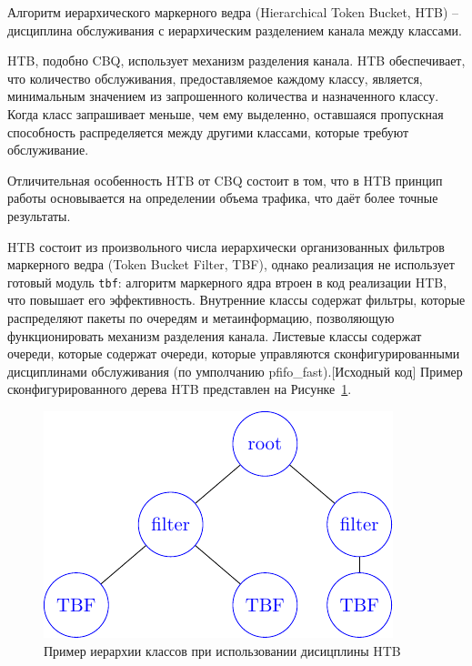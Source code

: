         Алгоритм иерархического маркерного ведра (Hierarchical Token Bucket, HTB) -- дисциплина
        обслуживания с иерархическим разделением канала между классами.

		HTB, подобно CBQ, использует механизм разделения канала. 
		HTB обеспечивает, что количество обслуживания, предоставляемое каждому классу, является,
		минимальным значением из запрошенного количества и назначенного классу. Когда класс
		запрашивает меньше, чем ему выделенно, оставшаяся пропускная способность распределяется между
		другими классами, которые требуют обслуживание.\cite{htb}

		Отличительная особенность HTB от CBQ состоит в том, что в HTB принцип работы
		основывается на определении объема трафика\cite{lartc}, что даёт более точные результаты.

		HTB состоит из произвольного числа иерархически организованных фильтров маркерного
        ведра (Token Bucket Filter, TBF)\cite{packethandling}, однако реализация не использует готовый
		модуль \texttt{tbf}: алгоритм маркерного ядра втроен в код реализации HTB,	
		что повышает его эффективность. Внутренние классы содержат фильтры, которые
		распределяют пакеты по очередям и метаинформацию, позволяющую функционировать
		механизм разделения канала. Листевые классы содержат очереди, которые содержат
		очереди, которые управляются сконфигурированными дисциплинами обслуживания (по
		умполчанию pfifo\_fast).[Исходный код] Пример сконфигурированного дерева HTB
		представлен на Рисунке~\ref{pic:htb_hier}.
		
        \begin{figure}[ht!]
            \center
            \includegraphics[scale=1.4]{./pdfimages/class_hierh_htb.pdf}
            \caption{Пример иерархии классов при использовании дисицплины HTB}
			\label{pic:htb_hier}
        \end{figure}


